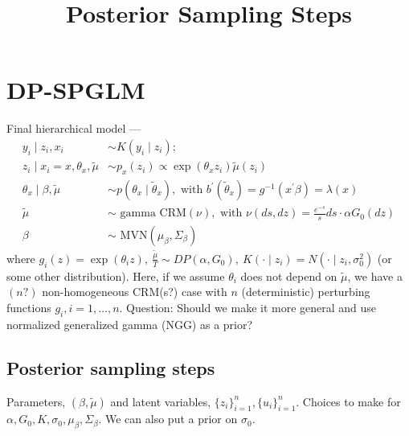 \documentclass[10pt, oneside]{article}   	%
\title{Posterior Sampling Steps}
\date{}							%
\renewcommand{\th}{\theta}
\newcommand{\tmu}{\widetilde{\mu}}
\begin{document}
\maketitle

\section{DP-SPGLM}
Final hierarchical model ---
\begin{align*}
 y_i \mid  z_i, x_i & \sim K(y_i \mid z_i); \\
z_i \mid x_i = x, \theta_{x}, \tmu & \sim p_x(z_i) \propto
                                       \exp(\th_{x} z_i) \widetilde
                                       \mu(z_i) \\ 
\theta_x \mid \beta, \tmu & \sim p(\theta_x \mid \widetilde \theta_x), \text{ with } {b^\prime}(\widetilde \theta_x) = g^{-1}(x^\prime \beta) = \lambda(x)  \\ 
\tmu & \sim \text{ gamma CRM}(\nu), \text{ with } \nu(ds, dz) = \frac{e^{-s}}{s} ds \cdot \alpha G_0(dz) \\ 
\beta & \sim \text{ MVN}(\mu_\beta, \Sigma_\beta) 
\end{align*}
where $ g_i(z) = \exp(\th_i z), \  \frac{\widetilde \mu}{T}  \sim DP(\alpha, G_0), \ K(\cdot \mid z_i)  = N(\cdot \mid z_i, \sigma^2_0)$ (or some other distribution). Here, if we assume $\theta_i$ does not depend on $\widetilde \mu$, we have a $(n?)$ non-homogeneous CRM(s?) case with $n$ (deterministic) perturbing functions $g_i, i=1, \dots, n$.
\newline Question: Should we make it more general and use normalized generalized gamma (NGG) as a prior? 
\subsection{Posterior sampling steps}
Parameters, $(\beta, \widetilde \mu)$ and latent variables,  $\{z_i\}_{i=1}^n, \{u_i\}_{i=1}^n$. 
\newline Choices to make for $\alpha, G_0, K, \sigma_0, \mu_\beta, \Sigma_\beta$. We can also put a prior on $\sigma_0$.
\end{document}
